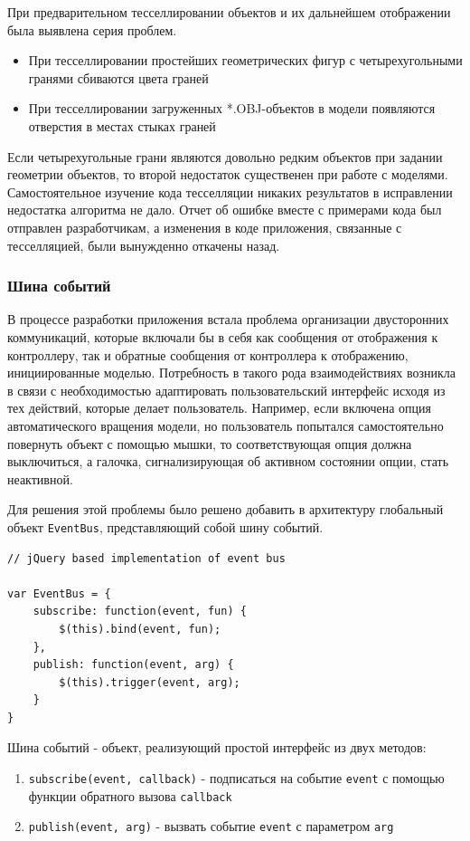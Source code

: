 \documentclass[14pt, a4paper]{extarticle}
\begin{document}
При предварительном тесселлировании объектов и их дальнейшем отображении была
выявлена серия проблем.

\begin{itemize}
    \item При тесселлировании простейших геометрических фигур с четырехугольными
    гранями сбиваются цвета граней
    \item При тесселлировании загруженных *.OBJ-объектов в модели появляются
    отверстия в местах стыках граней
\end{itemize}

Если четырехугольные грани являются довольно редким объектов при задании
геометрии объектов, то второй недостаток существенен при работе с моделями.
Самостоятельное изучение кода тесселляции никаких результатов в
исправлении недостатка алгоритма не дало. Отчет об ошибке вместе с примерами
кода был отправлен разработчикам, а изменения в коде приложения,
связанные с тесселляцией, были вынужденно откачены назад.

\subsubsection{Шина событий}

В процессе разработки приложения встала проблема организации двусторонних
коммуникаций,
которые включали бы в себя как сообщения от отображения к контроллеру, так и
обратные сообщения от контроллера к отображению, инициированные моделью.
Потребность в такого рода взаимодействиях возникла в связи с необходимостью
адаптировать пользовательский интерфейс исходя из тех действий, которые делает
пользователь. Например, если включена опция автоматического вращения модели,
но пользователь попытался самостоятельно повернуть объект с помощью мышки, то
соответствующая опция должна выключиться, а галочка, сигнализирующая об активном
состоянии опции, стать неактивной.

Для решения этой проблемы было решено добавить в архитектуру глобальный объект
\texttt{EventBus}, представляющий собой шину событий.

\begin{lstlisting}
// jQuery based implementation of event bus

var EventBus = {
    subscribe: function(event, fun) {
        $(this).bind(event, fun);
    },
    publish: function(event, arg) {
        $(this).trigger(event, arg);
    }
}
\end{lstlisting}

Шина событий - объект, реализующий простой интерфейс из двух методов:
\begin{enumerate}
    \item \texttt{subscribe(event, callback)} - подписаться на событие
    \texttt{event} с помощью функции обратного вызова \texttt{callback}
    \item \texttt{publish(event, arg)} - вызвать событие
    \texttt{event} с параметром \texttt{arg}
\end{enumerate}
\end{document}
